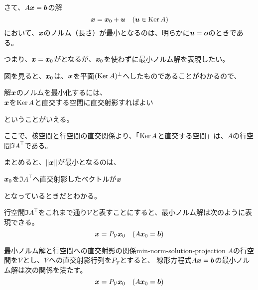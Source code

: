 \documentclass[../../../topic_linear-algebra]{subfiles}
\begin{document}
さて、$A\vb*{x} = \vb*{b}$の解
\begin{equation*}
  \vb*{x} = \vb*{x}_0 + \vb*{u} \quad (\vb*{u} \in \operatorname{Ker} A)
\end{equation*}
において、$\vb*{x}$のノルム（長さ）が最小となるのは、明らかに$\vb*{u} = \vb*{o}$のときである。

つまり、$\vb*{x} = \vb*{x}_0$がとなるが、$\vb*{x}_0$を使わずに最小ノルム解を表現したい。

\br

図を見ると、$\vb*{x}_0$は、$\vb*{x}$を平面$(\operatorname{Ker} A)^\perp$へしたものであることがわかるので、
\begin{emphabox}
  \begin{spacebox}
    \begin{center}
      解$\vb*{x}$のノルムを最小化するには、\\
      $\vb*{x}$を$\operatorname{Ker} A$と直交する空間に直交射影すればよい
    \end{center}
  \end{spacebox}
\end{emphabox}
ということがいえる。

\br

ここで、\hyperref[thm:kernel-row-orthogonality]{核空間と行空間の直交関係}より、「$\operatorname{Ker} A$と直交する空間」は、$A$の行空間$\Im A^\top$である。

\br

まとめると、$\| \vb*{x} \|$が最小となるのは、
\begin{spacebox}
  \begin{center}
    $\vb*{x}_0$を$\Im A^\top$へ直交射影したベクトルが$\vb*{x}$
  \end{center}
\end{spacebox}
となっているときだとわかる。

\br

行空間$\Im A^\top$をこれまで通り$\mathcal{V}$と表すことにすると、最小ノルム解は次のように表現できる。
\begin{equation*}
  \vb*{x} = P_{\mathcal{V}} \vb*{x}_0 \quad (A\vb*{x}_0 = \vb*{b})
\end{equation*}

\begin{theorem}{最小ノルム解と行空間への直交射影の関係}{min-norm-solution-projection}
  $A$の行空間を$\mathcal{V}$とし、$\mathcal{V}$への直交射影行列を$P_{\mathcal{V}}$とすると、
  線形方程式$A\vb*{x} = \vb*{b}$の最小ノルム解は次の関係を満たす。
  \begin{equation*}
    \vb*{x} = P_{\mathcal{V}} \vb*{x}_0 \quad (A\vb*{x}_0 = \vb*{b})
  \end{equation*}
\end{theorem}
\end{document}
